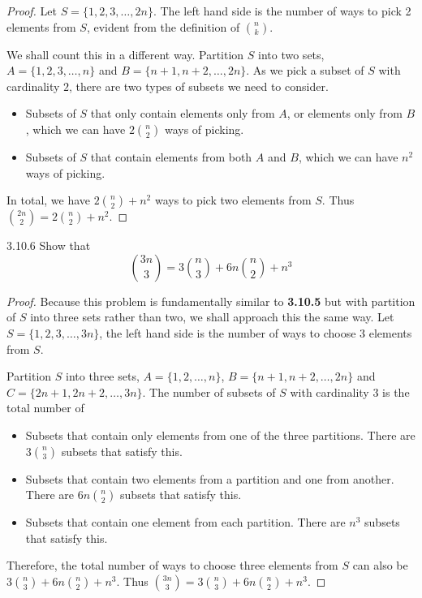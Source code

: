 \documentclass{exam}
\begin{document}
\begin{proof}
    Let $S = \{1, 2, 3, \dots, 2n\}$. The left hand side is the number of ways to pick 2 elements from $S$, evident from the definition of $\binom{n}{k}$.

    We shall count this in a different way. Partition $S$ into two sets, $A=\{1, 2, 3, \dots,n\}$ and $B=\{n+1, n+2,  \dots, 2n\}$. As we pick a subset of $S$ with cardinality $2$, there are two types of subsets we need to consider.
    
    \begin{itemize}
        \item Subsets of $S$ that only contain elements only from $A$, or elements only from $B$, which we can have $2\binom{n}2$ ways of picking.
        \item Subsets of $S$ that contain elements from both $A$ and $B$, which we can have $n^2$ ways of picking.
    \end{itemize}

    In total, we have $2\binom{n}2 + n^2$ ways to pick two elements from $S$. Thus $\binom{2n}{2} = 2\binom{n}2 + n^2$.
\end{proof}

\begin{problem}{3.10.6}
    Show that $$\binom{3n}{3}=3\binom{n}3+6n\binom{n}2+n^3$$
\end{problem}

\begin{proof}
    Because this problem is fundamentally similar to \textbf{3.10.5} but with partition of $S$ into three sets rather than two, we shall approach this the same way. Let $S = \{1, 2, 3, \dots, 3n\}$, the left hand side is the number of ways to choose 3 elements from $S$.

    Partition $S$ into three sets, $A = \{1, 2,  \dots, n\}$, $B = \{n+1, n+2,  \dots, 2n\}$ and $C=\{2n + 1, 2n + 2,  \dots, 3n\}$. The number of subsets of $S$ with cardinality $3$ is the total number of

    \begin{itemize}
        \item Subsets that contain only elements from one of the three partitions. There are $3\binom{n}3$ subsets that satisfy this.
        \item Subsets that contain two elements from a partition and one from another. There are $6n\binom{n}2$ subsets that satisfy this.
        \item Subsets that contain one element from each partition. There are $n^3$ subsets that satisfy this.
    \end{itemize}

    Therefore, the total number of ways to choose three elements from $S$ can also be $3\binom{n}3+6n\binom{n}2+n^3$. Thus $\binom{3n}{3}=3\binom{n}3+6n\binom{n}2+n^3$.
\end{proof}
\end{document}

